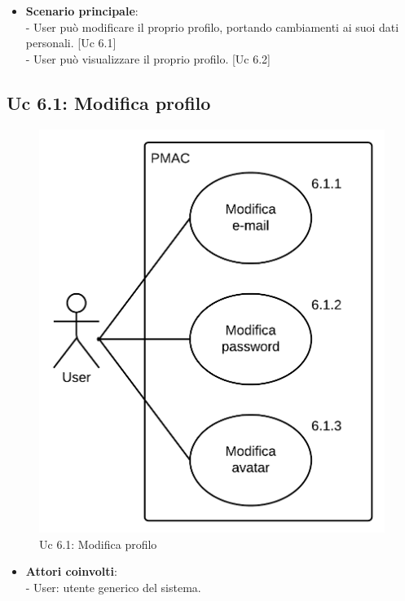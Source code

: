 {\begin{itemize}
\item \textbf{Scenario principale}:\\
- User può modificare il proprio profilo, portando cambiamenti ai suoi dati personali. [Uc 6.1]\\
- User può visualizzare il proprio profilo. [Uc 6.2]
\end{itemize}

\newpage

\subsection{Uc 6.1: Modifica profilo}
\begin{figure}[ht]
\centering
\caption{Uc 6.1: Modifica profilo}
\includegraphics[scale=0.9]{images/cap1/UseCase/Uc6_1} %
\end{figure}

\begin{itemize}
\item \textbf{Attori coinvolti}:\\
- User: utente generico del sistema.


\end{itemize}}
